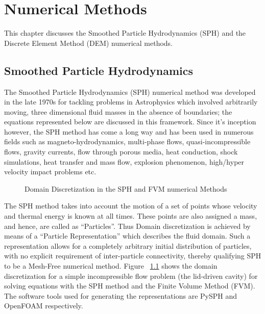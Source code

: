 \chapter{Numerical Methods}
%

This chapter discusses the Smoothed Particle Hydrodynamics (SPH) and the Discrete Element Method (DEM) numerical methods.

\section{Smoothed Particle Hydrodynamics}

The Smoothed Particle Hydrodynamics (SPH) numerical method was developed in the late 1970s \cite{gingold_monaghan} for tackling problems in Astrophysics which involved arbitrarily moving, three dimensional fluid masses in the absence of boundaries; the equations represented below are discussed in this framework. Since it's inception however, the SPH method has come a long way and has been used in numerous fields such as magneto-hydrodynamics, multi-phase flows, quasi-incompressible flows, gravity currents, flow through porous media, heat conduction, shock simulations, heat transfer and mass flow, explosion phenomenon, high/hyper velocity impact problems etc.

\begin{figure}[htb!]
\centering
\setlength\fboxsep{0pt}
\caption{{\small{Domain Discretization in the SPH and FVM numerical Methods}}}
\label{fig:particle_representation}
\end{figure}

The SPH method takes into account the motion of a set of points whose velocity and thermal energy is known at all times. These points are also assigned a mass, and hence, are called as ``Particles''.\cite{monaghan_intro} Thus Domain discretization is achieved by means of a ``Particle Representation'' which describes the fluid domain. Such a representation allows for a completely arbitrary initial distribution of particles, with no explicit requirement of inter-particle connectivity, thereby qualifying SPH to be a Mesh-Free numerical method. Figure ~\ref{fig:particle_representation} shows the domain discretization for a simple incompressible flow problem (the lid-driven cavity) for solving equations with the SPH method and the Finite Volume Method (FVM). The software tools used for generating the representations are PySPH \cite{prabhu_puri} and OpenFOAM respectively.

